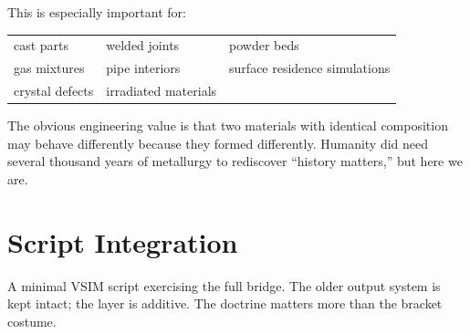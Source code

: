 \documentclass[11pt,a4paper]{article}
\begin{document}
This is especially important for:

\vspace{4pt}
\begin{center}\small
\begin{tabular}{@{}lll@{}}
cast parts & welded joints & powder beds \\
gas mixtures & pipe interiors & surface residence simulations \\
crystal defects & irradiated materials & \\
\end{tabular}
\end{center}
\vspace{4pt}

The obvious engineering value is that two materials with identical composition may behave
differently because they formed differently. Humanity did need several thousand years of
metallurgy to rediscover ``history matters,'' but here we are.

\section{Script Integration}

A minimal VSIM script exercising the full bridge. The older \code{[export]} output system
is kept intact; the  layer is additive. The doctrine
matters more than the bracket costume.
\end{document}
